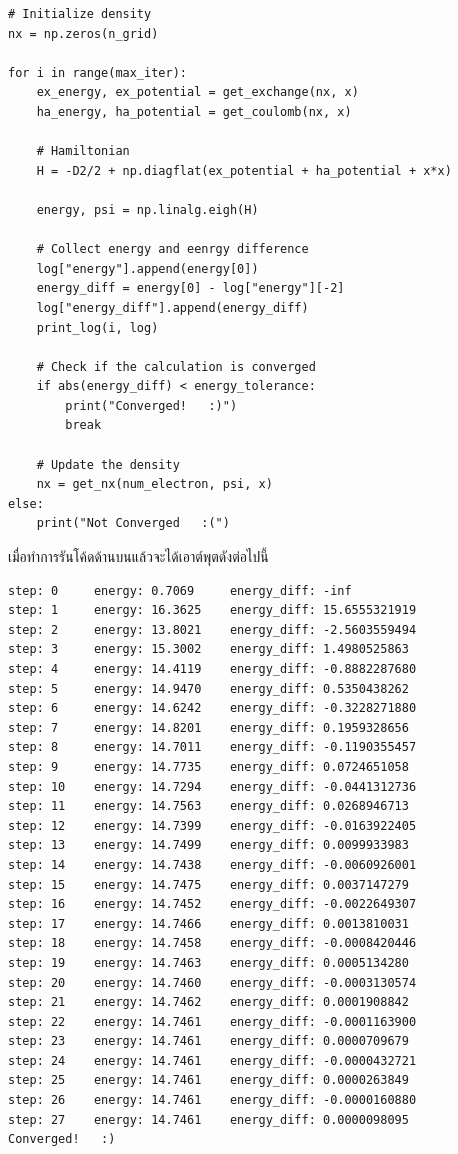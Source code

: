 \begin{lstlisting}[style=MyPython]
# Initialize density
nx = np.zeros(n_grid)

for i in range(max_iter):
    ex_energy, ex_potential = get_exchange(nx, x)
    ha_energy, ha_potential = get_coulomb(nx, x)
    
    # Hamiltonian
    H = -D2/2 + np.diagflat(ex_potential + ha_potential + x*x)
    
    energy, psi = np.linalg.eigh(H)
    
    # Collect energy and eenrgy difference
    log["energy"].append(energy[0])
    energy_diff = energy[0] - log["energy"][-2]
    log["energy_diff"].append(energy_diff)
    print_log(i, log)
    
    # Check if the calculation is converged
    if abs(energy_diff) < energy_tolerance:
        print("Converged!   :)")
        break
    
    # Update the density
    nx = get_nx(num_electron, psi, x)
else:
    print("Not Converged   :(")
\end{lstlisting}

\vspace{1em}

\noindent เมื่อทำการรันโค้ดด้านบนแล้วจะได้เอาต์พุตดังต่อไปนี้

\begin{lstlisting}[style=MyPython]
step: 0     energy: 0.7069     energy_diff: -inf
step: 1     energy: 16.3625    energy_diff: 15.6555321919
step: 2     energy: 13.8021    energy_diff: -2.5603559494
step: 3     energy: 15.3002    energy_diff: 1.4980525863
step: 4     energy: 14.4119    energy_diff: -0.8882287680
step: 5     energy: 14.9470    energy_diff: 0.5350438262
step: 6     energy: 14.6242    energy_diff: -0.3228271880
step: 7     energy: 14.8201    energy_diff: 0.1959328656
step: 8     energy: 14.7011    energy_diff: -0.1190355457
step: 9     energy: 14.7735    energy_diff: 0.0724651058
step: 10    energy: 14.7294    energy_diff: -0.0441312736
step: 11    energy: 14.7563    energy_diff: 0.0268946713
step: 12    energy: 14.7399    energy_diff: -0.0163922405
step: 13    energy: 14.7499    energy_diff: 0.0099933983
step: 14    energy: 14.7438    energy_diff: -0.0060926001
step: 15    energy: 14.7475    energy_diff: 0.0037147279
step: 16    energy: 14.7452    energy_diff: -0.0022649307
step: 17    energy: 14.7466    energy_diff: 0.0013810031
step: 18    energy: 14.7458    energy_diff: -0.0008420446
step: 19    energy: 14.7463    energy_diff: 0.0005134280
step: 20    energy: 14.7460    energy_diff: -0.0003130574
step: 21    energy: 14.7462    energy_diff: 0.0001908842
step: 22    energy: 14.7461    energy_diff: -0.0001163900
step: 23    energy: 14.7461    energy_diff: 0.0000709679
step: 24    energy: 14.7461    energy_diff: -0.0000432721
step: 25    energy: 14.7461    energy_diff: 0.0000263849
step: 26    energy: 14.7461    energy_diff: -0.0000160880
step: 27    energy: 14.7461    energy_diff: 0.0000098095
Converged!   :)
\end{lstlisting}


